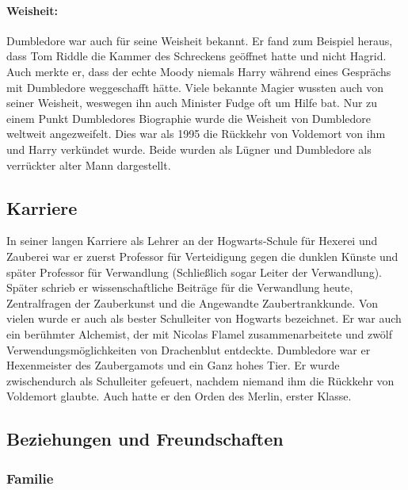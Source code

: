 \documentclass[a4paper, 10pt]{article}
\begin{document}
\paragraph{Weisheit:}
Dumbledore war auch für seine Weisheit bekannt. Er fand zum Beispiel heraus, dass Tom Riddle die Kammer des Schreckens geöffnet hatte und nicht Hagrid. Auch merkte er, dass der echte Moody niemals Harry während eines Gesprächs mit Dumbledore weggeschafft hätte. Viele bekannte Magier wussten auch von seiner Weisheit, weswegen ihn auch Minister Fudge oft um Hilfe bat. Nur zu einem Punkt Dumbledores Biographie wurde die Weisheit von Dumbledore weltweit angezweifelt. Dies war als 1995 die Rückkehr von Voldemort von ihm und Harry verkündet wurde. Beide wurden als Lügner und Dumbledore als verrückter alter Mann dargestellt.


\subsection*{\Large Karriere}
In seiner langen Karriere als Lehrer an der Hogwarts-Schule für Hexerei und Zauberei war er zuerst Professor für Verteidigung gegen die dunklen Künste und später Professor für Verwandlung (Schließlich sogar Leiter der Verwandlung). Später schrieb er wissenschaftliche Beiträge für die Verwandlung heute, Zentralfragen der Zauberkunst und die Angewandte Zaubertrankkunde. Von vielen wurde er auch als bester Schulleiter von Hogwarts bezeichnet. Er war auch ein berühmter Alchemist, der mit Nicolas Flamel zusammenarbeitete und zwölf Verwendungsmöglichkeiten von Drachenblut entdeckte.
\vspace{10pt}
\newline
{}  
Dumbledore war er Hexenmeister des Zaubergamots und ein Ganz hohes Tier. Er wurde zwischendurch als Schulleiter gefeuert, nachdem niemand ihm die Rückkehr von Voldemort glaubte. Auch hatte er den Orden des Merlin, erster Klasse.

\subsection*{\Large Beziehungen und Freundschaften}
\subsubsection*{\large Familie}
\end{document}

